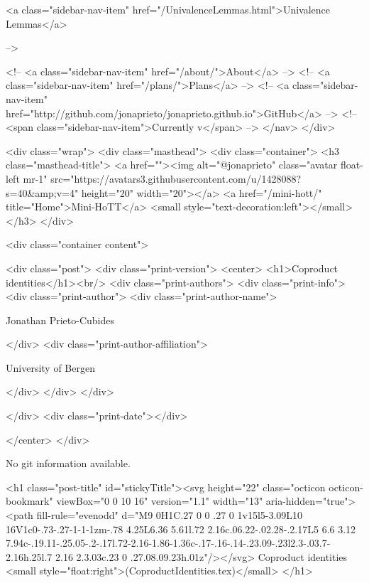      
    
      
        
          <a class="sidebar-nav-item" href="/UnivalenceLemmas.html">Univalence Lemmas</a>
        
      
     -->

    <!-- <a class="sidebar-nav-item" href="/about/">About</a> -->
    <!-- <a class="sidebar-nav-item" href="/plans/">Plans</a> -->
    <!-- <a class="sidebar-nav-item" href="http://github.com/jonaprieto/jonaprieto.github.io">GitHub</a> -->
    <!-- <span class="sidebar-nav-item">Currently v</span> -->
  </nav>
</div>

    <div class="wrap">
      <div class="masthead">
        <div class="container">
          <h3 class="masthead-title">
            <a href=""><img alt="@jonaprieto" class="avatar float-left mr-1" src="https://avatars3.githubusercontent.com/u/1428088?s=40&amp;v=4" height="20" width="20"></a>
            <a href="/mini-hott/" title="Home">Mini-HoTT</a>
            <small style="text-decoration:left"></small>
          </h3>
        </div>
      
      <div class="container content">
        







<div class="post">
  <div class="print-version">
    <center>
      <h1>Coproduct identities</h1><br/>
        <div class="print-authors">
          <div class="print-info">
            <div class="print-author">
              <div class="print-author-name">
                
                  Jonathan Prieto-Cubides
                
              </div>
              <div class="print-author-affiliation">
                
                  University of Bergen
                
                </div>
            </div>
          </div>
          
          
        </div>
        <div class="print-date"></div>
        
        
    </center>
  </div>

  
  No git information available.
  

  <h1 class="post-title" id="stickyTitle"><svg height="22" class="octicon octicon-bookmark" viewBox="0 0 10 16" version="1.1" width="13" aria-hidden="true"><path fill-rule="evenodd" d="M9 0H1C.27 0 0 .27 0 1v15l5-3.09L10 16V1c0-.73-.27-1-1-1zm-.78 4.25L6.36 5.61l.72 2.16c.06.22-.02.28-.2.17L5 6.6 3.12 7.94c-.19.11-.25.05-.2-.17l.72-2.16-1.86-1.36c-.17-.16-.14-.23.09-.23l2.3-.03.7-2.16h.25l.7 2.16 2.3.03c.23 0 .27.08.09.23h.01z"/></svg> Coproduct identities <small style="float:right">(CoproductIdentities.tex)</small>
  </h1>

